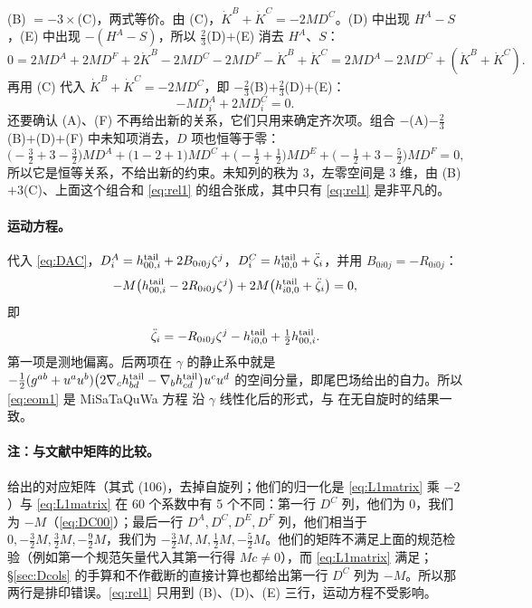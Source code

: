 \documentclass[11pt,a4paper]{ctexart}
\numberwithin{equation}{section}
\begin{document}
(B) $=-3\times$(C)，两式等价。由 (C)，$\dot K^B+\dot K^C=-2MD^C$。(D) 中出现 $H^A-S$，(E) 中出现 $-(H^A-S)$，所以 $\tfrac23$(D)$+$(E) 消去 $H^A$、$S$：
\begin{equation*}
0=2MD^A+2MD^F+2\dot K^B-2MD^C-2MD^F-\dot K^B+\dot K^C
=2MD^A-2MD^C+(\dot K^B+\dot K^C).
\end{equation*}
再用 (C) 代入 $\dot K^B+\dot K^C=-2MD^C$，即 $-\tfrac23$(B)$+\tfrac23$(D)$+$(E)：
\begin{equation}
-MD^A_i+2MD^C_i=0 .
\label{eq:rel1}
\end{equation}
还要确认 (A)、(F) 不再给出新的关系，它们只用来确定齐次项。组合 $-$(A)$-\tfrac23$(B)$+$(D)$+$(F) 中未知项消去，$D$ 项也恒等于零：
\begin{equation*}
\big(-\tfrac32+3-\tfrac32\big)MD^A+\big(1-2+1\big)MD^C+\big(-\tfrac12+\tfrac12\big)MD^E+\big(-\tfrac12+3-\tfrac52\big)MD^F=0 ,
\end{equation*}
所以它是恒等关系，不给出新的约束。未知列的秩为 3，左零空间是 3 维，由 (B)$+3$(C)、上面这个组合和 \eqref{eq:rel1} 的组合张成，其中只有 \eqref{eq:rel1} 是非平凡的。

\paragraph{运动方程。}代入 \eqref{eq:DAC}，$D^A_i=h^{\rm tail}_{00,i}+2B_{0i0j}\zeta^j$，$D^C_i=h^{\rm tail}_{i0,0}+\ddot\zeta_i$，并用 $B_{0i0j}=-R_{0i0j}$：
\begin{equation*}
-M\big(h^{\rm tail}_{00,i}-2R_{0i0j}\zeta^j\big)+2M\big(h^{\rm tail}_{i0,0}+\ddot\zeta_i\big)=0,
\end{equation*}
即
\begin{equation}
\ddot\zeta_i=-R_{0i0j}\zeta^j-h^{\rm tail}_{i0,0}+\tfrac12h^{\rm tail}_{00,i}.
\label{eq:eom1}
\end{equation}
第一项是测地偏离。后两项在 $\gamma$ 的静止系中就是 $-\tfrac12(g^{ab}+u^au^b)\big(2\nabla_ch^{\rm tail}_{bd}-\nabla_bh^{\rm tail}_{cd}\big)u^cu^d$ 的空间分量，即尾巴场给出的自力。所以 \eqref{eq:eom1} 是 MiSaTaQuWa 方程 \citep{MinoSasakiTanaka1997,QuinnWald1997} 沿 $\gamma$ 线性化后的形式，与 \citet{GrallaWald2008} 在无自旋时的结果一致。

\paragraph{注：与文献中矩阵的比较。}\citet{GrallaWald2008} 给出的对应矩阵（其式 (106)，去掉自旋列；他们的归一化是 \eqref{eq:L1matrix} 乘 $-2$）与 \eqref{eq:L1matrix} 在 60 个系数中有 5 个不同：第一行 $D^C$ 列，他们为 $0$，我们为 $-M$（\eqref{eq:DC00}）；最后一行 $D^A,D^C,D^E,D^F$ 列，他们相当于 $0,-\tfrac32M,\tfrac32M,-\tfrac92M$，我们为 $-\tfrac32M,M,\tfrac12M,-\tfrac52M$。他们的矩阵不满足上面的规范检验（例如第一个规范矢量代入其第一行得 $Mc\neq0$），而 \eqref{eq:L1matrix} 满足；\S\ref{sec:Dcols} 的手算和不作截断的直接计算也都给出第一行 $D^C$ 列为 $-M$。所以那两行是排印错误。\eqref{eq:rel1} 只用到 (B)、(D)、(E) 三行，运动方程不受影响。
\end{document}
